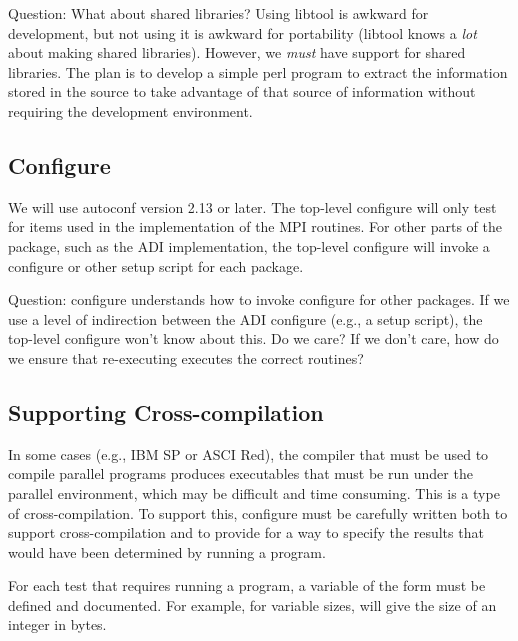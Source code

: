 \documentclass{article}
\begin{document}
Question: What about shared libraries?  Using libtool is awkward for
development, but not using it is awkward for portability (libtool
knows a \emph{lot} about making shared libraries).  However, we
\emph{must} have support for shared libraries.  The plan is to develop
a simple perl program to extract the information stored in the
 source to take advantage of that source of information
without requiring the  development environment.

\subsection{Configure}
\label{sec:configure}
We will use autoconf version 2.13 or later.  The top-level configure will only
test for items used in the implementation of the MPI routines.  For
other parts of the package, such as the ADI implementation, the
top-level configure will invoke a configure or other setup script for
each package.

Question: configure understands how to invoke configure for other
packages.  If we use a level of indirection between the ADI configure
(e.g., a setup script), the top-level configure won't know about
this.  Do we care?  If we don't care, how do we ensure that
re-executing  executes the correct routines?

\subsection{Supporting Cross-compilation}
\label{sec:cross-compile}
In some cases (e.g., IBM SP or ASCI Red), the compiler that must be used to
compile parallel programs produces executables that must be run under
the parallel environment, which may be difficult and time consuming.
This is a type of cross-compilation.  To support this, configure must
be carefully written both to support cross-compilation and to provide
for a way to specify the results that would have been determined by
running a program.

For each test that requires running a program, a variable of the form
 must be defined and documented.  For example, for
variable sizes,  will give the size of an
integer in bytes.
\end{document}
